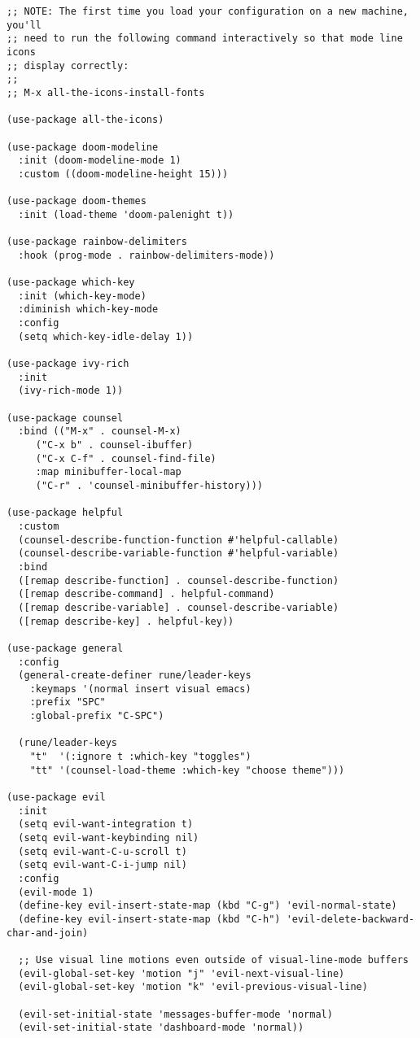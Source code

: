 \documentclass[11pt]{article}
\begin{document}
\begin{verbatim}
;; NOTE: The first time you load your configuration on a new machine, you'll
;; need to run the following command interactively so that mode line icons
;; display correctly:
;;
;; M-x all-the-icons-install-fonts

(use-package all-the-icons)

(use-package doom-modeline
  :init (doom-modeline-mode 1)
  :custom ((doom-modeline-height 15)))

(use-package doom-themes
  :init (load-theme 'doom-palenight t))

(use-package rainbow-delimiters
  :hook (prog-mode . rainbow-delimiters-mode))

(use-package which-key
  :init (which-key-mode)
  :diminish which-key-mode
  :config
  (setq which-key-idle-delay 1))

(use-package ivy-rich
  :init
  (ivy-rich-mode 1))

(use-package counsel
  :bind (("M-x" . counsel-M-x)
	 ("C-x b" . counsel-ibuffer)
	 ("C-x C-f" . counsel-find-file)
	 :map minibuffer-local-map
	 ("C-r" . 'counsel-minibuffer-history)))

(use-package helpful
  :custom
  (counsel-describe-function-function #'helpful-callable)
  (counsel-describe-variable-function #'helpful-variable)
  :bind
  ([remap describe-function] . counsel-describe-function)
  ([remap describe-command] . helpful-command)
  ([remap describe-variable] . counsel-describe-variable)
  ([remap describe-key] . helpful-key))

(use-package general
  :config
  (general-create-definer rune/leader-keys
    :keymaps '(normal insert visual emacs)
    :prefix "SPC"
    :global-prefix "C-SPC")

  (rune/leader-keys
    "t"  '(:ignore t :which-key "toggles")
    "tt" '(counsel-load-theme :which-key "choose theme")))

(use-package evil
  :init
  (setq evil-want-integration t)
  (setq evil-want-keybinding nil)
  (setq evil-want-C-u-scroll t)
  (setq evil-want-C-i-jump nil)
  :config
  (evil-mode 1)
  (define-key evil-insert-state-map (kbd "C-g") 'evil-normal-state)
  (define-key evil-insert-state-map (kbd "C-h") 'evil-delete-backward-char-and-join)

  ;; Use visual line motions even outside of visual-line-mode buffers
  (evil-global-set-key 'motion "j" 'evil-next-visual-line)
  (evil-global-set-key 'motion "k" 'evil-previous-visual-line)

  (evil-set-initial-state 'messages-buffer-mode 'normal)
  (evil-set-initial-state 'dashboard-mode 'normal))


\end{verbatim}
\end{document}

